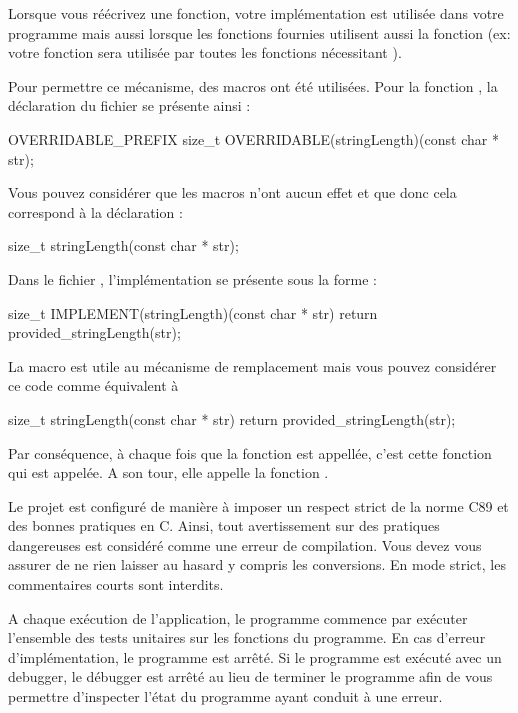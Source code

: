 Lorsque vous réécrivez une fonction, votre implémentation est utilisée dans
votre programme mais aussi lorsque les fonctions fournies utilisent aussi la
fonction (ex: votre fonction  sera utilisée par toutes
les fonctions  nécessitant ).

Pour permettre ce mécanisme, des macros ont été utilisées. Pour la fonction , la déclaration du fichier  se présente ainsi :
\begin{csource}
OVERRIDABLE_PREFIX size_t OVERRIDABLE(stringLength)(const char * str);
\end{csource}
Vous pouvez considérer que les macros n'ont aucun effet et que donc cela correspond à la déclaration :
\begin{csource}
size_t stringLength(const char * str);
\end{csource}
Dans le fichier , l'implémentation se présente sous la forme :
\begin{csource}
size_t IMPLEMENT(stringLength)(const char * str) {
    return provided_stringLength(str);
}
\end{csource}
La macro  est utile au mécanisme de remplacement mais vous pouvez considérer ce code comme équivalent à
\begin{csource}
size_t stringLength(const char * str) {
    return provided_stringLength(str);
}
\end{csource}
Par conséquence, à chaque fois que la fonction  est appellée, c'est cette fonction qui est appelée. A son tour, elle appelle la fonction .

\begin{warning}
Le projet est configuré de manière à imposer un respect strict de la norme C89
et des bonnes pratiques en C. Ainsi, tout avertissement sur des pratiques
dangereuses est considéré comme une erreur de compilation. Vous devez vous assurer de ne rien
laisser au hasard y compris les conversions. En mode strict, les commentaires courts \ccode{//} sont interdits.
\end{warning}

A chaque exécution de l'application, le programme commence par exécuter
l'ensemble des tests unitaires sur les fonctions du programme. En cas d'erreur
d'implémentation, le programme est arrêté. Si le programme est exécuté avec un
debugger, le débugger est arrêté au lieu de terminer le programme afin de vous
permettre d'inspecter l'état du programme ayant conduit à une erreur.

